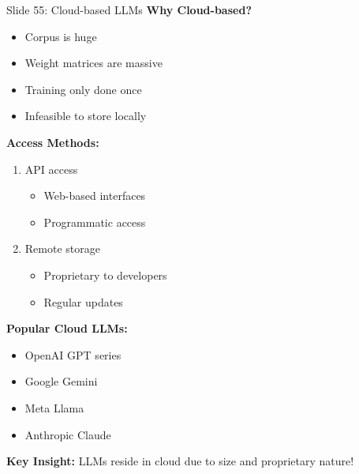 \documentclass[8pt]{beamer}
\begin{document}
	\begin{frame}{Slide 55: Cloud-based LLMs}
		\fontsize{6.5}{7.5}\selectfont
		\textbf{Why Cloud-based?}
		\begin{itemize}
			\item Corpus is huge
			\item Weight matrices are massive
			\item Training only done once
			\item Infeasible to store locally
		\end{itemize}
		
		\vspace{0.1cm}
		\textbf{Access Methods:}
		\begin{enumerate}
			\item API access
			\begin{itemize}
				\item Web-based interfaces
				\item Programmatic access
			\end{itemize}
			\item Remote storage
			\begin{itemize}
				\item Proprietary to developers
				\item Regular updates
			\end{itemize}
		\end{enumerate}
		
		\vspace{0.1cm}
		\textbf{Popular Cloud LLMs:}
		\begin{itemize}
			\item OpenAI GPT series
			\item Google Gemini
			\item Meta Llama
			\item Anthropic Claude
		\end{itemize}
		
		\textcolor{myblue}{\textbf{Key Insight:}} LLMs reside in cloud due to size and proprietary nature!
	\end{frame}
	
\end{document}
